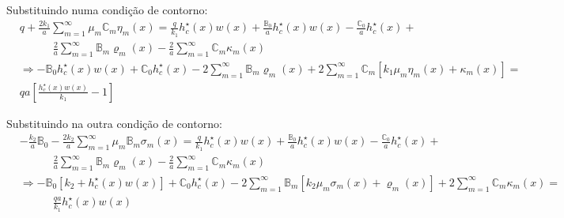 Substituindo numa condição de contorno:
\begin{align}
& q + \frac{2k_1}{a}\sum_{m=1}^\infty \mu_m\mathbb{C}_m \eta_m(x)  = \frac{q}{k_1}h^\star_c(x) w(x) + \frac{\mathbb{B}_0}{a}h^\star_c(x)w(x) - \frac{\mathbb{C}_0}{a}h^\star_c(x) + \nonumber \\
& \quad\quad\quad \frac{2}{a}\sum_{m=1}^\infty\mathbb{B}_m \varrho_m(x)  - \frac{2}{a}\sum_{m=1}^\infty \mathbb{C}_m \kappa_m(x) \nonumber \\
& \Rightarrow - \mathbb{B}_0 h^\star_c(x)w(x) + \mathbb{C}_0 h^\star_c(x) - 2\sum_{m=1}^\infty\mathbb{B}_m \varrho_m(x) + 2\sum_{m=1}^\infty \mathbb{C}_m[k_1\mu_m \eta_m(x) + \kappa_m(x)] = \nonumber \\ 
& qa\left[\frac{h^\star_c(x) w(x)}{k_1} - 1\right]
\end{align}

Substituindo na outra condição de contorno:
\begin{align}
& - \frac{k_2}{a}\mathbb{B}_0 - \frac{2k_2}{a}\sum_{m=1}^\infty \mu_m \mathbb{B}_m \sigma_m(x)= \frac{q}{k_1}h^\star_c(x) w(x) + \frac{\mathbb{B}_0}{a}h^\star_c(x)w(x) - \frac{\mathbb{C}_0}{a}h^\star_c(x) + \nonumber \\
& \quad\quad\quad \frac{2}{a}\sum_{m=1}^\infty\mathbb{B}_m \varrho_m(x)  - \frac{2}{a}\sum_{m=1}^\infty \mathbb{C}_m \kappa_m(x) \nonumber \\
& \Rightarrow - \mathbb{B}_0[k_2 + h^\star_c(x)w(x)] + \mathbb{C}_0 h^\star_c(x) - 2\sum_{m=1}^\infty \mathbb{B}_m[k_2\mu_m  \sigma_m(x) + \varrho_m(x)] + 2\sum_{m=1}^\infty \mathbb{C}_m \kappa_m(x) = \nonumber \\
& \quad\quad\quad \frac{qa}{k_1}h^\star_c(x) w(x)
\end{align}